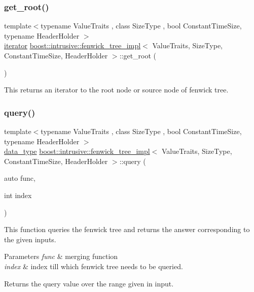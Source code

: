 \subsubsection{\texorpdfstring{get\+\_\+root()}{get\_root()}}
{\footnotesize\ttfamily template$<$typename Value\+Traits , class Size\+Type , bool Constant\+Time\+Size, typename Header\+Holder $>$ \\
\hyperlink{classboost_1_1intrusive_1_1fenwick__tree__impl_a6293502e34de9b16ae198ec557c82132}{iterator} \hyperlink{classboost_1_1intrusive_1_1fenwick__tree__impl}{boost\+::intrusive\+::fenwick\+\_\+tree\+\_\+impl}$<$ Value\+Traits, Size\+Type, Constant\+Time\+Size, Header\+Holder $>$\+::get\+\_\+root (\begin{DoxyParamCaption}{ }\end{DoxyParamCaption})\hspace{0.3cm}{\ttfamily [inline]}}

This returns an iterator to the root node or source node of fenwick tree. \mbox{\label{classboost_1_1intrusive_1_1fenwick__tree__impl_ab264157cf44f71965593bef1444d97ec}} 
\subsubsection{\texorpdfstring{query()}{query()}}
{\footnotesize\ttfamily template$<$typename Value\+Traits , class Size\+Type , bool Constant\+Time\+Size, typename Header\+Holder $>$ \\
\hyperlink{classboost_1_1intrusive_1_1fenwick__tree__impl_acc226a36fd0f4814574917193e0c59ef}{data\+\_\+type} \hyperlink{classboost_1_1intrusive_1_1fenwick__tree__impl}{boost\+::intrusive\+::fenwick\+\_\+tree\+\_\+impl}$<$ Value\+Traits, Size\+Type, Constant\+Time\+Size, Header\+Holder $>$\+::query (\begin{DoxyParamCaption}\item[{auto}]{func,  }\item[{int}]{index }\end{DoxyParamCaption})\hspace{0.3cm}{\ttfamily [inline]}}

This function queries the fenwick tree and returns the answer corresponding to the given inputs. 
\begin{DoxyParams}{Parameters}
{\em func} & merging function \\
\hline
{\em index} & index till which fenwick tree needs to be queried. \\
\hline
\end{DoxyParams}
\begin{DoxyReturn}{Returns}
the query value over the range given in input.
\end{DoxyReturn}


